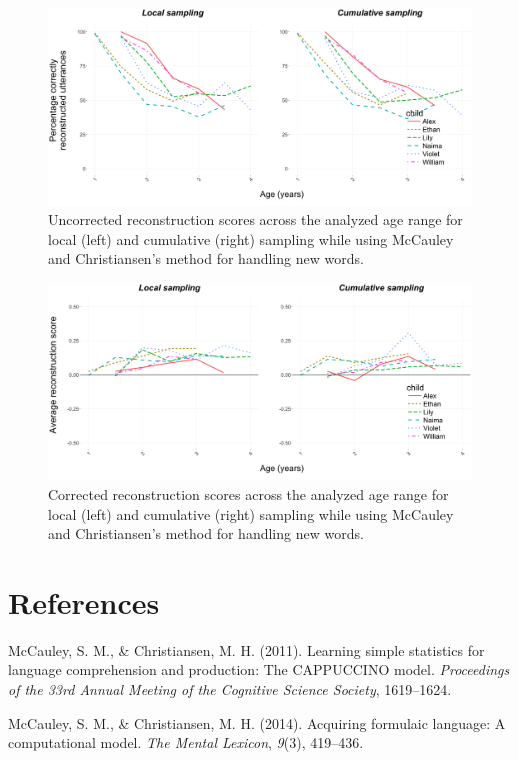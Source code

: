 \documentclass[man,mask,floatsintext]{apa6}
\begin{document}
\begin{figure}

{\centering \includegraphics[width=0.95\linewidth]{images/suppl_bothreconperc} 

}

\caption{Uncorrected reconstruction scores across the analyzed age range for local (left) and cumulative (right) sampling while using McCauley and Christiansen's method for handling new words.}\label{fig:smfig1}
\end{figure}

\begin{figure}

{\centering \includegraphics[width=0.95\linewidth]{images/suppl_bothreconscore} 

}

\caption{Corrected reconstruction scores across the analyzed age range for local (left) and cumulative (right) sampling while using McCauley and Christiansen's method for handling new words.}\label{fig:smfig2}
\end{figure}

\newpage

\section{References}\label{references}

\begingroup
\setlength{\parindent}{-0.5in} \setlength{\leftskip}{0.5in}

\hypertarget{refs}{}
\hypertarget{ref-mccauley2011learning}{}
McCauley, S. M., \& Christiansen, M. H. (2011). Learning simple
statistics for language comprehension and production: The CAPPUCCINO
model. \emph{Proceedings of the 33rd Annual Meeting of the Cognitive
Science Society}, 1619--1624.

\hypertarget{ref-mccauley2014acquiring}{}
McCauley, S. M., \& Christiansen, M. H. (2014). Acquiring formulaic
language: A computational model. \emph{The Mental Lexicon}, \emph{9}(3),
419--436.

\endgroup
\end{document}
